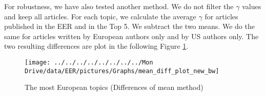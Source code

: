 \documentclass[
  12pt,
  onecolumn]{article}
\begin{document}
For robustness, we have also tested another method. We do not filter the \(\gamma\) values and keep all articles. For each topic, we calculate the average \(\gamma\) for articles published in the EER and in the Top 5. We subtract the two means. We do the same for articles written by European authors only and by US authors only. The two resulting differences are plot in the following Figure \ref{fig:plot-topic-diff-alternative}.

\begin{figure}[H]

{\centering \texttt{[image: ../../../../../../../../Mon Drive/data/EER/pictures/Graphs/mean\_diff\_plot\_new\_bw]} 

}

\caption{The most European topics (Differences of mean method)}\label{fig:plot-topic-diff-alternative}
\end{figure}
\end{document}
